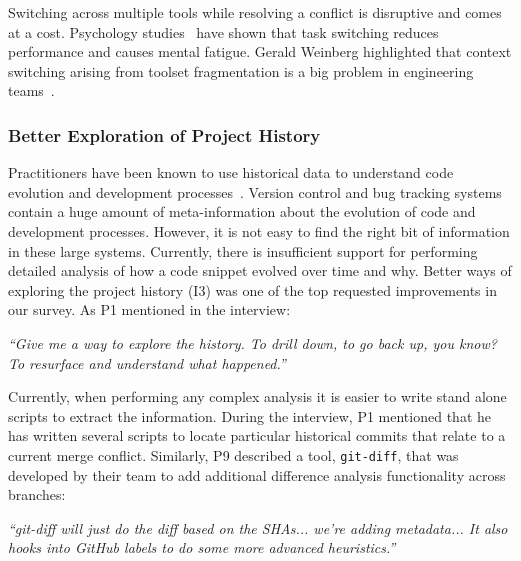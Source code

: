 Switching across multiple tools while resolving a conflict is disruptive and comes at a cost. Psychology studies~\cite{Meiran2000}\cite{gopher2000switching} have shown that task switching reduces performance and causes mental fatigue. 
Gerald Weinberg highlighted that context switching arising from toolset fragmentation is a big problem in engineering teams~\cite{Weinberg1992}. 


\subsubsection{Better Exploration of Project History}
Practitioners have been known to use historical data to understand code evolution and development processes~\cite{Mihai_lenses}.
Version control and bug tracking systems contain a huge amount of meta-information about the evolution of code and development processes.
However, it is not easy to find the right bit of information in these large systems. 
Currently, there is insufficient support for performing detailed analysis of how a code snippet evolved over time and why. 
Better ways of exploring the project history (I3) was one of the top requested improvements in our survey. 
As P1 mentioned in the interview:
\begin{quoting}
\textit{``Give me a way to explore the history. To drill down, to go back up, you know? To resurface and understand what happened.''}
\end{quoting}


Currently, when performing any complex analysis it is easier to write stand alone scripts to extract the information. 
During the interview, P1 mentioned that he has written several scripts to locate particular historical commits that relate to a current merge conflict. 
Similarly, P9 described a tool, \texttt{git-diff}, that was developed by their team to add additional difference analysis functionality across branches:
\begin{quoting}
\textit{``git-diff will just do the diff based on the SHAs... we're adding metadata... It also hooks into GitHub labels to do some more advanced heuristics.''}
\end{quoting}

